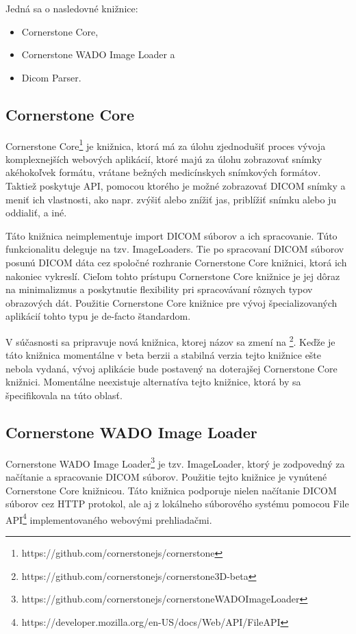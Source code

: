 Jedná sa o nasledovné knižnice:
\begin {itemize}
\item {Cornerstone Core,}
\item {Cornerstone WADO Image Loader a}
\item {Dicom Parser.}
\end {itemize}

\subsection {Cornerstone Core}
Cornerstone Core\footnote{https://github.com/cornerstonejs/cornerstone} je knižnica, ktorá má za úlohu zjednodušiť proces vývoja komplexnejších webových aplikácií, ktoré majú za úlohu zobrazovať snímky akéhokoľvek formátu, vrátane bežných medicínskych snímkových formátov. Taktiež poskytuje API, pomocou ktorého je možné zobrazovať DICOM snímky a meniť ich vlastnosti, ako napr. zvýšiť alebo znížiť jas, priblížiť snímku alebo ju oddialiť, a iné.

Táto knižnica neimplementuje import DICOM súborov a ich spracovanie. Túto funkcionalitu deleguje na tzv. ImageLoaders. Tie po spracovaní DICOM súborov posunú DICOM dáta cez spoločné rozhranie Cornerstone Core knižnici, ktorá ich nakoniec vykreslí. Cieľom tohto prístupu Cornerstone Core knižnice je jej dôraz na minimalizmus a poskytnutie flexibility pri spracovávaní rôznych typov obrazových dát. Použitie Cornerstone Core knižnice pre vývoj špecializovaných aplikácií tohto typu je de-facto štandardom.

V súčasnosti sa pripravuje nová  knižnica, ktorej názov sa zmení na \footnote{https://github.com/cornerstonejs/cornerstone3D-beta}. Keďže je táto knižnica momentálne v beta berzii a stabilná verzia tejto knižnice ešte nebola vydaná, vývoj aplikácie bude postavený na doterajšej Cornerstone Core knižnici.
Momentálne neexistuje alternatíva tejto knižnice, ktorá by sa špecifikovala na túto oblasť.

\subsection {Cornerstone WADO Image Loader}
Cornerstone WADO Image Loader\footnote{https://github.com/cornerstonejs/cornerstoneWADOImageLoader} je tzv. ImageLoader, ktorý je zodpovedný za načítanie a spracovanie DICOM súborov. Použitie tejto knižnice je vynútené Cornerstone Core knižnicou. Táto knižnica podporuje nielen načítanie DICOM súborov cez HTTP protokol, ale aj z lokálneho súborového systému pomocou File API\footnote{https://developer.mozilla.org/en-US/docs/Web/API/File\textunderscore API} implementovaného webovými prehliadačmi.

